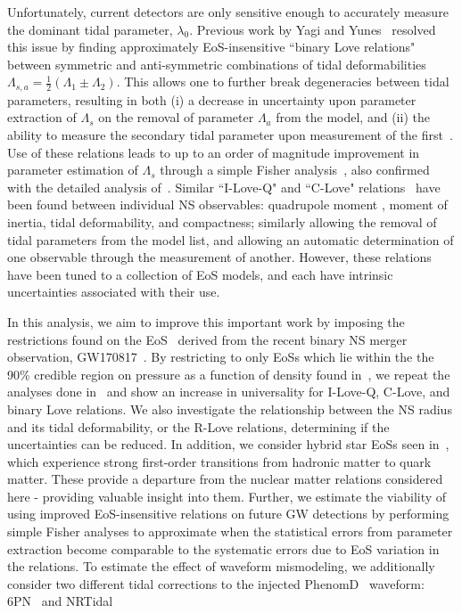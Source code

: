 \documentclass[prd,twocolumn,nofootinbib,superscriptaddress,amsmath,amssymb]{revtex4-1}
\begin{document}
Unfortunately, current detectors are only sensitive enough to accurately measure the dominant tidal parameter, $\lambda_0$.
Previous work by Yagi and Yunes~\cite{Yagi:binLove} resolved this issue by finding approximately EoS-insensitive ``binary Love relations" between symmetric and anti-symmetric combinations of tidal deformabilities $\Lambda_{s,a}=\frac{1}{2}(\Lambda_1 \pm \Lambda_2)$.
This allows one to further break degeneracies between tidal parameters, resulting in both (i) a decrease in uncertainty upon parameter extraction of $\Lambda_s$ on the removal of parameter $\Lambda_a$ from the model, and (ii) the ability to measure the secondary tidal parameter upon measurement of the first~\cite{Katerina:residuals}.  
Use of these relations leads to up to an order of magnitude improvement in parameter estimation of $\Lambda_s$ through a simple Fisher analysis~\cite{Yagi:binLove}, also confirmed with the detailed analysis of~\cite{Katerina:residuals}.
Similar ``I-Love-Q" and ``C-Love" relations~\cite{Yagi:ILQ} have been found between individual NS observables: quadrupole moment , moment of inertia, tidal deformability, and compactness; similarly allowing the removal of tidal parameters from the model list, and allowing an automatic determination of one observable through the measurement of another.
However, these relations have been tuned to a collection of EoS models, and each have intrinsic uncertainties associated with their use.

In this analysis, we aim to improve this important work by imposing the restrictions found on the EoS~\cite{LIGO:posterior} derived from the recent binary NS merger observation, GW170817~\cite{TheLIGOScientific:2017qsa}.
By restricting to only EoSs which lie within the the 90\% credible region on pressure as a function of density found in~\cite{LIGO:posterior}, we repeat the analyses done in~\cite{Yagi:binLove,Yagi:ILQ} and show an increase in universality for I-Love-Q, C-Love, and binary Love relations.
We also investigate the relationship between the NS radius and its tidal deformability, or the R-Love relations, determining if the uncertainties can be reduced.
In addition, we consider hybrid star EoSs seen in~\cite{Paschalidis2018}, which experience strong first-order transitions from hadronic matter to quark matter.
These provide a departure from the nuclear matter relations considered here - providing valuable insight into them.
Further, we estimate the viability of using improved EoS-insensitive relations on future GW detections by performing simple Fisher analyses to approximate when the statistical errors from parameter extraction become comparable to the systematic errors due to EoS variation in the relations.
To estimate the effect of waveform mismodeling, we additionally consider two different tidal corrections to the injected PhenomD~\cite{PhenomDI,PhenomDII} waveform: 6PN~\cite{Wade:tidalCorrections} and NRTidal~\cite{Samajdar:NRTidal}
\end{document}
